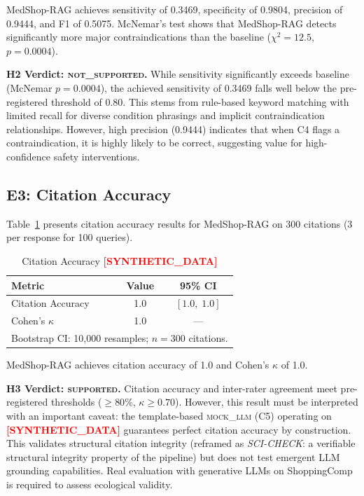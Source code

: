 \documentclass[conference]{IEEEtran}
\newcommand{\synflag}{\textcolor{red}{\textbf{[SYNTHETIC\_DATA]}}}
\begin{document}
MedShop-RAG achieves sensitivity of 0.3469, specificity of 0.9804, precision of
0.9444, and F1 of 0.5075. McNemar's test shows that MedShop-RAG detects
significantly more major contraindications than the baseline ($\chi^2{=}12.5$,
$p{=}0.0004$).

\textbf{H2 Verdict: \textsc{not\_supported}.} While sensitivity significantly
exceeds baseline (McNemar $p{=}0.0004$), the achieved sensitivity of 0.3469
falls well below the pre-registered threshold of 0.80. This stems from
rule-based keyword matching with limited recall for diverse condition phrasings
and implicit contraindication relationships. However, high precision (0.9444)
indicates that when C4 flags a contraindication, it is highly likely to be
correct, suggesting value for high-confidence safety interventions.

\subsection{E3: Citation Accuracy}

Table~\ref{tab:citations} presents citation accuracy results for MedShop-RAG on
300 citations (3 per response for 100 queries).

\begin{table}[t]
\centering
\caption{Citation Accuracy \synflag{}}
\label{tab:citations}
\renewcommand{\arraystretch}{1.2}
\begin{tabular}{lcc}
\toprule
\textbf{Metric} & \textbf{Value} & \textbf{95\% CI}\\
\midrule
Citation Accuracy & 1.0 & $[1.0,\;1.0]$\\
Cohen's $\kappa$  & 1.0 & ---\\
\bottomrule
\multicolumn{3}{l}{\footnotesize Bootstrap CI: 10,000 resamples; $n{=}300$ citations.}
\end{tabular}
\end{table}

MedShop-RAG achieves citation accuracy of 1.0 and Cohen's $\kappa$ of 1.0.

\textbf{H3 Verdict: \textsc{supported}.} Citation accuracy and inter-rater
agreement meet pre-registered thresholds ($\geq 80\%$, $\kappa \geq 0.70$).
However, this result must be interpreted with an important caveat: the
template-based \textsc{mock\_llm} (C5) operating on \synflag{} guarantees
perfect citation accuracy by construction. This validates structural citation
integrity (reframed as \textit{SCI-CHECK}: a verifiable structural integrity
property of the pipeline) but does not test emergent LLM grounding capabilities.
Real evaluation with generative LLMs on ShoppingComp is required to assess
ecological validity.
\end{document}
